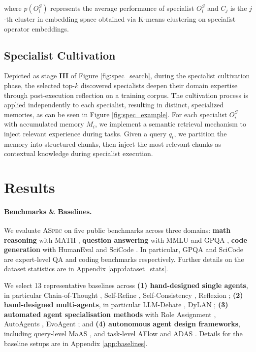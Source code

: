 \documentclass{article} %
\begin{document}
where $p(O_i^S)$ represents the average performance of specialist $O_i^S$ and $C_j$ is the $j$-th cluster in embedding space obtained via K-means clustering on specialist operator embeddings. 

\subsection{Specialist Cultivation}
\label{subsec:spec_culti}
Depicted as stage \textbf{III} of Figure \ref{fig:spec_search}, during the specialist cultivation phase, the selected top-$k$ discovered specialists deepen their domain expertise through post-execution reflection on a training corpus. The cultivation process is applied independently to each specialist, resulting in distinct, specialized memories, as can be seen in Figure \ref{fig:spec_example}. For each specialist $O_i^S$ with accumulated memory $M_i$, we implement a semantic retrieval mechanism \citep{lewis2020retrieval} to inject relevant experience during tasks. Given a query $q_t$, we partition the memory into structured chunks, then inject the most relevant chunks as contextual knowledge during specialist execution.


\section{Results}
\paragraph{Benchmarks \& Baselines.} We evaluate \textsc{ASpec} on five public benchmarks across three domains: \textbf{math reasoning} with MATH \citep{hendrycks2021measuring}, \textbf{question answering} with MMLU \citep{hendrycks2021measuring} and GPQA \citep{rein2024gpqa}, \textbf{code generation} with HumanEval \citep{chen2021evaluating} and SciCode \citep{tian2024scicode}. In particular, GPQA and SciCode are expert-level QA and coding benchmarks respectively. Further details on the dataset statistics are in Appendix \ref{app:dataset_stats}. 

We select 13 representative baselines across \textbf{(1) hand-designed single agents}, in particular Chain-of-Thought \citep{wei2022chain}, Self-Refine \citep{madaan2023self}, Self-Consistency \citep{wang2022self}, Reflexion \citep{shinn2023reflexion}; \textbf{(2) hand-designed multi-agents}, in particular LLM-Debate \citep{du2023improving}, DyLAN \citep{liu2023dynamic}; \textbf{(3) automated agent specialisation methods} with Role Assignment \citep{xu2023expertprompting}, AutoAgents \citep{chen2023autoagents}, EvoAgent \citep{yuan2024evoagent}; and \textbf{(4) autonomous agent design frameworks}, including query-level MaAS \citep{zhang2025multi}, and task-level AFlow \citep{zhang2024aflow} and ADAS \citep{hu2024automated}. Details for the baseline setups are in Appendix \ref{app:baselines}.
\end{document}
